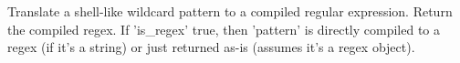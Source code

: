 \begin{DoxyVerb}Translate a shell-like wildcard pattern to a compiled regular
expression.  Return the compiled regex.  If 'is_regex' true,
then 'pattern' is directly compiled to a regex (if it's a string)
or just returned as-is (assumes it's a regex object).
\end{DoxyVerb}
 